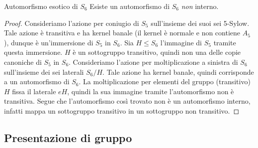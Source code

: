 \begin{proposition}{Automorfismo esotico di $S_6$}
    Esiste un automorfismo di $S_6$ \emph{non} interno.
\end{proposition}
\begin{proof}
    Consideriamo l'azione per coniugio di $S_5$ sull'insieme dei suoi sei 5-Sylow. Tale azione è transitiva e ha kernel banale (il kernel è normale e non contiene $A_5$), dunque è un'immersione di $S_5$ in $S_6$. Sia $H \le S_6$ l'immagine di $S_5$ tramite questa immersione. $H$ è un sottogruppo transitivo, quindi non una delle copie canoniche di $S_5$ in $S_6$. Consideriamo l'azione per moltiplicazione a sinistra di $S_6$ sull'insieme dei sei laterali $S_6/H$. Tale azione ha kernel banale, quindi corrisponde a un automorfismo di $S_6$. La moltiplicazione per elementi del gruppo (transitivo) $H$ fissa il laterale $eH$, quindi la sua immagine tramite l'automorfismo non è transitiva. Segue che l'automorfismo così trovato non è un automorfismo interno, infatti mappa un sottogruppo transitivo in un sottogruppo non transitivo.
\end{proof}

\subsection{Presentazione di gruppo}


